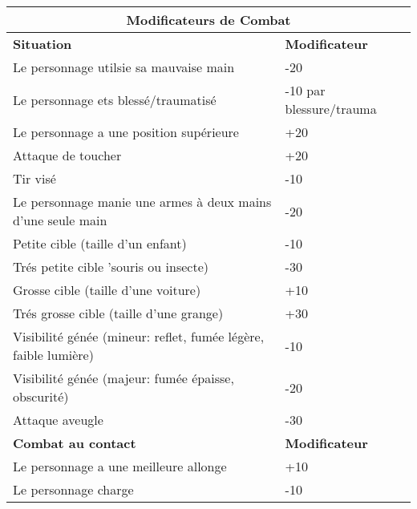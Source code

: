 \begin{table} \begin{tabularx}{\textwidth}{|X|l|} \hline

\multicolumn{2}{|c|}{\textbf{Modificateurs de Combat}} \\ \hline

\textbf{Situation} &\textbf{Modificateur}	\\ \hline

Le personnage utilsie sa mauvaise main	&-20	\\ \hline

Le personnage ets blessé/traumatisé	&-10 par blessure/trauma	\\ \hline

Le personnage a une position supérieure	&+20	\\ \hline

Attaque de toucher	&+20	\\ \hline

Tir visé	&-10	\\ \hline

Le personnage manie une armes à deux mains d'une seule main &-20	\\ \hline

Petite cible (taille d'un enfant)	&-10	\\ \hline

Trés petite cible 'souris ou insecte)	&-30	\\ \hline

Grosse cible (taille d'une voiture) &+10	\\ \hline

Trés grosse cible (taille d'une grange) &+30	\\ \hline

Visibilité génée (mineur: reflet, fumée légère, faible lumière) &-10	\\ \hline

Visibilité génée (majeur: fumée épaisse, obscurité) &-20	\\ \hline

Attaque aveugle &-30	\\ \hline

\textbf{Combat au contact} &\textbf{Modificateur}	\\ \hline

Le personnage a une meilleure allonge &+10	\\ \hline

Le personnage charge &-10	\\ \hline


\end{tabularx}
\end{table}
